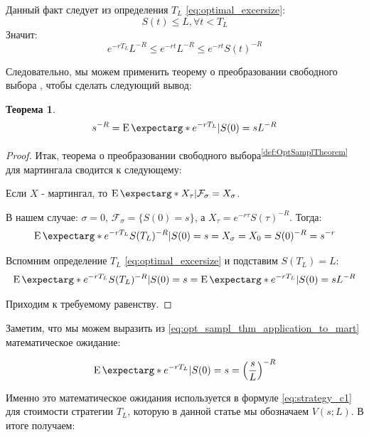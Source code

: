 \documentclass[a4paper,12pt]{article}
\newtheorem{theorem}{Теорема}
\theoremstyle{definition}
\newcommand{\expect}{\operatorname{E}\expectarg}
\begin{document}
Данный факт следует из определения $T_L$ \eqref{eq:optimal_excersize}:
\begin{equation*}
S(t) \le L, \forall t < T_L
\end{equation*}
Значит:
\begin{equation*}
e^{-r T_L} L^{-R} \le e^{-rt}L^{-R} \le e^{-rt}S(t)^{-R}
\end{equation*}

Следовательно, мы можем применить теорему о преобразовании свободного выбора \cite{bib:Shiryaev}, чтобы сделать следующий вывод:
\begin{theorem}
\begin{equation}\label{eq:opt_sampl_thm_application_to_mart}
s^{-R} = \expect*{e^{-rT_L} | S(0) = s} L^{-R}
\end{equation}
\end{theorem}
\begin{proof}
Итак, теорема о преобразовании свободного выбора\textsuperscript{\ref{def:OptSamplTheorem}} для мартингала сводится к следующему:

Если ${X}$ - мартингал, то $\expect*{X_{\tau} | \mathcal{F}_\sigma} = X_\sigma$.

В нашем случае: $\sigma = 0$, $\mathcal{F}_\sigma = \{S(0) = s\}$, а $X_{\tau} = e^{-r\tau} S(\tau)^{-R}$. Тогда:
\begin{equation*}
    \expect*{e^{-rT_L} S(T_L)^{-R} | S(0) = s} = X_\sigma = X_0 = S(0)^{-R} = s^{-r}
\end{equation*}

Вспомним определение $T_L$ \eqref{eq:optimal_excersize} и подставим $S(T_L) = L$:
\begin{equation}\label{eq:second_part_of_opt_sampl_thm_application_to_mart}
     \expect*{e^{-rT_L} S(T_L)^{-R} | S(0) = s} = \expect*{e^{-rT_L} | S(0) = s} L^{-R}
\end{equation}

Приходим к требуемому равенству.
\end{proof}

Заметим, что мы можем выразить из \eqref{eq:opt_sampl_thm_application_to_mart} математическое ожидание:

\begin{equation*}
    \expect*{e^{-rT_L} | S(0) = s} = \left(\frac{s}{L}\right)^{-R}
\end{equation*}

Именно это математическое ожидания используется в формуле \eqref{eq:strategy_c1} для стоимости стратегии $T_L$, которую в данной статье мы обозначаем $V(s; L)$. В итоге получаем:
\end{document}
